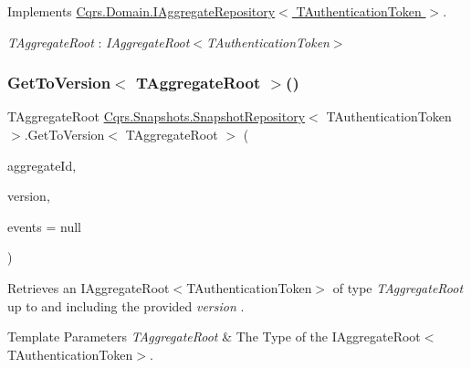 Implements \hyperlink{interfaceCqrs_1_1Domain_1_1IAggregateRepository_a32308a27ce03c5d406e16b17430dd040_a32308a27ce03c5d406e16b17430dd040}{Cqrs.\+Domain.\+I\+Aggregate\+Repository$<$ T\+Authentication\+Token $>$}.

\begin{Desc}
\item[Type Constraints]\begin{description}
\item[{\em T\+Aggregate\+Root} : {\em I\+Aggregate\+Root$<$T\+Authentication\+Token$>$}]\end{description}
\end{Desc}
\mbox{\label{classCqrs_1_1Snapshots_1_1SnapshotRepository_abdeca9aa6a5ce75e445888b2d0092a7d_abdeca9aa6a5ce75e445888b2d0092a7d}} 
\subsubsection{\texorpdfstring{Get\+To\+Version$<$ T\+Aggregate\+Root $>$()}{GetToVersion< TAggregateRoot >()}}
{\footnotesize\ttfamily T\+Aggregate\+Root \hyperlink{classCqrs_1_1Snapshots_1_1SnapshotRepository}{Cqrs.\+Snapshots.\+Snapshot\+Repository}$<$ T\+Authentication\+Token $>$.Get\+To\+Version$<$ T\+Aggregate\+Root $>$ (\begin{DoxyParamCaption}\item[{Guid}]{aggregate\+Id,  }\item[{int}]{version,  }\item[{I\+List$<$ \hyperlink{interfaceCqrs_1_1Events_1_1IEvent}{I\+Event}$<$ T\+Authentication\+Token $>$$>$}]{events = {\ttfamily null} }\end{DoxyParamCaption})}



Retrieves an I\+Aggregate\+Root$<$\+T\+Authentication\+Token$>$ of type {\itshape T\+Aggregate\+Root}  up to and including the provided {\itshape version} . 


\begin{DoxyTemplParams}{Template Parameters}
{\em T\+Aggregate\+Root} & The Type of the I\+Aggregate\+Root$<$\+T\+Authentication\+Token$>$.\\
\hline
\end{DoxyTemplParams}

